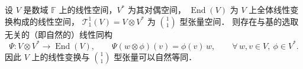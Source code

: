 
\begin{proposition}\label{chmla:thm_T11TR}
	设 $V$ 是数域 $\mathbb{F}$ 上的线性空间，$V^*$ 为其对偶空间，
	$\operatorname{End}(V)$ 为 $V$ 上全体线性变换构成的线性空间，
	$\mathcal{T}^1_1(V)=V\otimes V^*$ 为 $\binom{1}{1}$ 型张量空间．
	则存在与基的选取无关的（即自然的）线性同构
	\begin{equation*}
		\Psi: V\otimes V^* \longrightarrow \operatorname{End}(V),
		\qquad
		\Psi(w\otimes\phi)(v)=\phi(v)\,w,
		\qquad \forall\, w,v\in V,\ \phi\in V^* .
	\end{equation*}
	因此 $V$ 上的线性变换与 $\binom{1}{1}$ 型张量可以自然等同．
\end{proposition}

